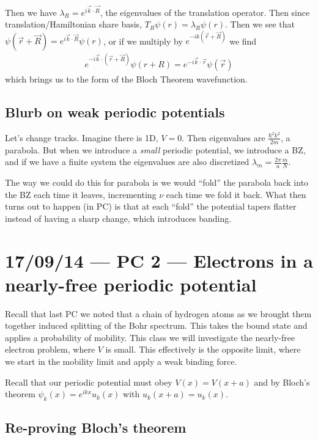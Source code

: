\documentclass[10pt]{report}
\begin{document}
Then we have $\lambda_{R} = e^{i\vec{k} \cdot \vec{R}}$, the eigenvalues of the translation operator. Then since translation/Hamiltonian share basis, $T_R\psi(r) = \lambda_R\psi(r)$. Then we see that $\psi(\vec{r} + \vec{R}) = e^{i\vec{k} \cdot \vec{R}}\psi(r)$, or if we multiply by $e^{-ik(\vec{r} + \vec{R})}$ we find
\begin{align}
    e^{-i\vec{k}\cdot(\vec{r} + \vec{R})}\psi(r + R) = e^{-i\vec{k} \cdot \vec{r}}\psi(\vec{r})
\end{align}
which brings us to the form of the Bloch Theorem wavefunction.

\section{Blurb on weak periodic potentials}

Let's change tracks. Imagine there is 1D, $V=0$. Then eigenvalues are $\frac{\hbar^2 k^2}{2m}$, a parabola. But when we introduce a \emph{small} periodic potential, we introduce a BZ, and if we have a finite system the eigenvalues are also discretized $\lambda_m = \frac{2\pi}{a}\frac{m}{N}$.

The way we could do this for parabola is we would ``fold'' the parabola back into the BZ each time it leaves, incrementing $\nu$ each time we fold it back. What then turns out to happen (in PC) is that at each ``fold'' the potential tapers flatter instead of having a sharp change, which introduces banding.

\chapter{17/09/14 --- PC 2 --- Electrons in a nearly-free periodic potential}

Recall that last PC we noted that a chain of hydrogen atoms as we brought them together induced splitting of the Bohr spectrum. This takes the bound state and applies a probability of mobility. This class we will investigate the nearly-free electron problem, where $V$ is small. This effectively is the opposite limit, where we start in the mobility limit and apply a weak binding force.

Recall that our periodic potential must obey $V(x) = V(x + a)$ and by Bloch's theorem $\psi_k(x) = e^{ikx}u_k(x)$ with $u_k(x+a) = u_k(x)$. 

\section{Re-proving Bloch's theorem}
\end{document}
